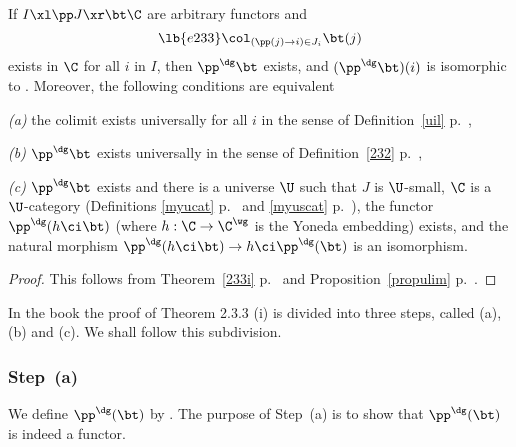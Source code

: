 \documentclass[12pt]{article}
\theoremstyle{remark}
\theoremstyle{definition}
\begin{document}
\begin{thm}
If $I\xl\pp J\xr\bt\C$ are arbitrary functors and  
\begin{equation}\lb{e233}
\col_{(\pp(j)\to i)\in J_i}\bt(j)
\end{equation}
exists in $\C$ for all $i$ in $I$, then $\pp^\dg\bt$ exists, and $(\pp^\dg\bt)(i)$ is isomorphic to . Moreover, the following conditions are equivalent

\nn\emph{(a)} the colimit  exists universally for all $i$ in the sense of Definition~\ref{uil} p.~,

\nn\emph{(b)} $\pp^\dg\bt$ exists universally in the sense of Definition~\ref{232} p.~,

\nn\emph{(c)} $\pp^\dg\bt$ exists and there is a universe $\U$ such that $J$ is $\U$-small, $\C$ is a $\U$-category (Definitions \ref{myucat} p.~ and \ref{myuscat} p.~), the functor $\pp^\dg(h\ci\bt)$ (where $h:\C\to\C^\wg$ is the Yoneda embedding) exists, and the natural morphism $\pp^\dg(h\ci\bt)\to h\ci\pp^\dg(\bt)$ is an isomorphism.
\end{thm}
\begin{proof}
This follows from Theorem~\ref{233i} p.~ and Proposition~\ref{propulim} p.~.
\end{proof}

In the book the proof of Theorem 2.3.3 (i) is divided into three steps, called (a), (b) and (c). We shall follow this subdivision.

\subsubsection{Step~(a)}


We define $\pp^\dg(\bt)$ by . The purpose of Step~(a) is to show that $\pp^\dg(\bt)$ is indeed a functor. 

\end{document}
